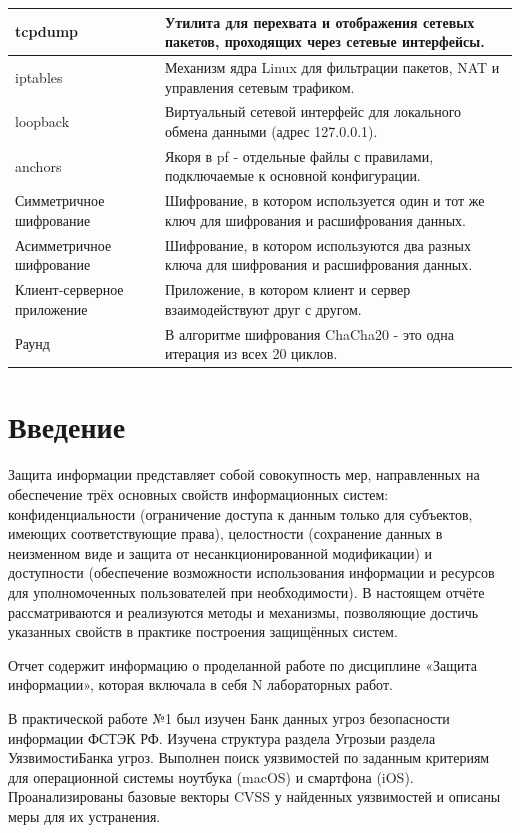 \documentclass[areasetadvanced]{scrartcl}
\begin{document}
\begin{center}
\begin{longtable}{>{\raggedright\arraybackslash}p{3.5cm}>{\raggedright\arraybackslash}p{9.5cm}}
\hline 
tcpdump & Утилита для перехвата и отображения сетевых пакетов, проходящих через сетевые интерфейсы. \\
\hline 
iptables & Механизм ядра Linux для фильтрации пакетов, NAT и управления сетевым трафиком. \\
\hline 
loopback & Виртуальный сетевой интерфейс для локального обмена данными (адрес 127.0.0.1). \\
\hline 
anchors & Якоря в pf - отдельные файлы с правилами, подключаемые к основной конфигурации. \\
\hline 
Симметричное шифрование & Шифрование, в котором используется один и тот же ключ для шифрования и расшифрования данных. \\
\hline 
Асимметричное шифрование & Шифрование, в котором используются два разных ключа для шифрования и расшифрования данных. \\
\hline 
Клиент-серверное приложение & Приложение, в котором клиент и сервер взаимодействуют друг с другом. \\
\hline
Раунд & В алгоритме шифрования ChaCha20 - это одна итерация из всех 20 циклов. \\
\end{longtable}
\end{center}

\newpage
\tableofcontents

\newpage
\section*{Введение}

Защита информации представляет собой совокупность мер, направленных на обеспечение трёх основных свойств информационных систем: конфиденциальности (ограничение доступа к данным только для субъектов, имеющих соответствующие права), целостности (сохранение данных в неизменном виде и защита от несанкционированной модификации) и доступности (обеспечение возможности использования информации и ресурсов для уполномоченных пользователей при необходимости). В настоящем отчёте рассматриваются и реализуются методы и механизмы, позволяющие достичь указанных свойств в практике построения защищённых систем.

Отчет содержит информацию о проделанной работе по дисциплине «Защита информации», которая включала в себя N лабораторных работ.

В практической работе №1 был изучен Банк данных угроз безопасности информации ФСТЭК РФ. Изучена структура раздела \guillemetleft Угрозы\guillemetright и раздела \guillemetleft Уязвимости\guillemetright Банка угроз. Выполнен поиск уязвимостей по заданным критериям для операционной системы ноутбука (macOS) и смартфона (iOS). Проанализированы базовые векторы CVSS у найденных уязвимостей и описаны меры для их устранения.
\end{document}
